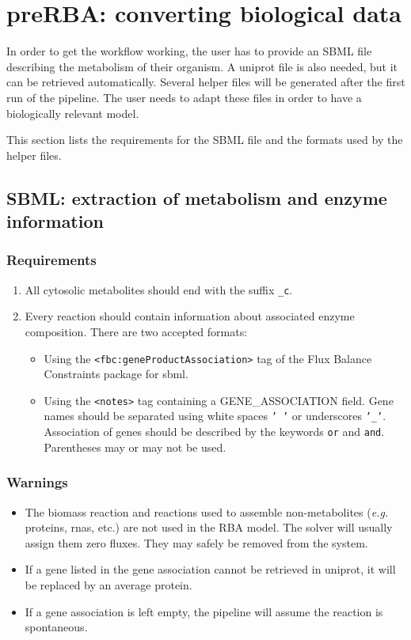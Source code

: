
\section{preRBA: converting biological data}

In order to get the workflow working, the user has to provide an SBML file describing the metabolism of their organism. A uniprot file is also needed, but it can be retrieved automatically. Several helper files will be generated after the first run of the pipeline. The user needs to adapt these files in order to have a biologically relevant model.

This section lists the requirements for the SBML file and the formats used by the helper files.

\subsection{SBML: extraction of metabolism and enzyme information}

\subsubsection{Requirements}
\begin{enumerate}
\item All cytosolic metabolites should end with the suffix \texttt{\_c}.
\item Every reaction should contain information about associated enzyme composition. There are two accepted formats:
  \begin{itemize}
  \item Using the \texttt{<fbc:geneProductAssociation>} tag of the Flux Balance Constraints package for sbml.
  \item Using the \texttt{<notes>} tag containing a GENE\_ASSOCIATION field. Gene names should be separated using white spaces \texttt{' '} or underscores \texttt{'\_'}. Association of genes should be described by the keywords \texttt{or} and \texttt{and}. Parentheses may or may not be used.
  \end{itemize}
\end{enumerate}

\subsubsection{Warnings}
\begin{itemize}
\item The biomass reaction and reactions used to assemble non-metabolites (\textit{e.g.} proteins, rnas, etc.) are not used in the RBA model. The solver will usually assign them zero fluxes. They may safely be removed from the system.
\item If a gene listed in the gene association cannot be retrieved in uniprot, it will be replaced by an average protein.
\item If a gene association is left empty, the pipeline will assume the reaction is spontaneous.
\end{itemize}
   
